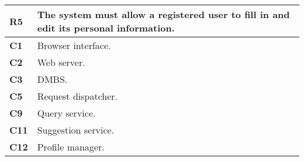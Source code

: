 \begin{table}[H]
    \centering
    \begin{tabular}{|l|m{10cm}|}
        \hline \textbf{R5} & The system must allow a registered user to fill in and edit its personal information.\\
        \hline \textbf{C1} & Browser interface. \\
        \hline \textbf{C2} & Web server. \\
        \hline \textbf{C3} & DMBS. \\
        \hline \textbf{C5} & Request dispatcher. \\
        \hline \textbf{C9} & Query service. \\
        \hline \textbf{C11} & Suggestion service. \\
        \hline \textbf{C12} & Profile manager.\\
        \hline
    \end{tabular}
\end{table}


